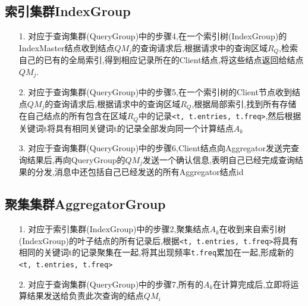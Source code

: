 \documentclass{elegantpaper}
\begin{document}
\subsection{索引集群IndexGroup}
\begin{itemize}
    \item[1.] 对应于查询集群(QueryGroup)中的步骤4,在一个索引树(IndexGroup)的IndexMaster结点收到结点$QM_j$的查询请求后,根据请求中的查询区域$R_Q$,检索自己的已有的全局索引,得到相应记录所在的Client结点,将这些结点返回给结点$QM_j$.
    \item[2.] 对应于查询集群(QueryGroup)中的步骤5,在一个索引树的Client节点收到结点$QM_j$的查询请求后,根据请求中的查询区域$R_Q$,根据局部索引,找到所有存储在自己结点的所有包含在区域$R_Q$中的记录\verb|<t, t.entries, t.freq>|,然后根据关键词t将具有相同关键词t的记录全部发向同一个计算结点$A_k$
    \item[3.] 对应于查询集群(QueryGroup)中的步骤6,Client结点向Aggregator发送完查询结果后,再向QueryGroup的$QM_j$发送一个确认信息,表明自己已经完成查询结果的分发,消息中还包括自己已经发送的所有Aggregator结点id
\end{itemize}
\subsection{聚集集群AggregatorGroup}
\begin{itemize}
    \item[1.] 对应于索引集群(IndexGroup)中的步骤2,聚集结点$A_k$在收到来自索引树(IndexGroup)的叶子结点的所有记录后,根据\verb|<t, t.entries, t.freq>|将具有相同的关键词t的记录聚集在一起,将其出现频率\verb|t.freq|累加在一起,形成新的\verb|<t, t.entries, t.freq>|
    \item[2.] 对应于查询集群(QueryGroup)中的步骤7,所有的$A_k$在计算完成后,立即将运算结果发送给负责此次查询的结点$QM_i$
\end{itemize}
\end{document}
